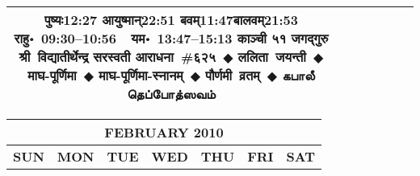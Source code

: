 \documentclass[a3paper,12pt,landscape]{article}
\newcommand{\eventsep}{~$\Diamondblack$ }
\newcommand{\To}{\hspace{1pt}\raisebox{0pt}{\tiny\RIGHTarrow}\hspace{1pt}}
\newcommand{\tamil}[1]{%
{\fontspec[Scale=0.9,FakeStretch=0.9]{Noto Sans Tamil} \footnotesize #1}}
\newcommand{\rahuyama}[2]{%
{राहु॰~\textsf{#1}~~यम॰~\textsf{#2}}
}
\begin{document}
\begin{center}
\begin{tabular}{|c|c|c|c|c|c|c|}
{{\mbox{पुष्यः\To{}\textsf{12:27\hspace{2ex}}}}%
{\mbox{आयुष्मान्\To{}\textsf{22:51\hspace{2ex}}}}%
{\mbox{बवम्\To{}\textsf{11:47\hspace{2ex}}}\mbox{बालवम्\To{}\textsf{21:53\hspace{2ex}}}}}%
{\rahuyama{09:30--10:56}{13:47--15:13}}%
{काञ्ची ५१ जगद्गुरु श्री~विद्यातीर्थेन्द्र सरस्वती आराधना~\#{६२५}\eventsep ललिता~जयन्ती\eventsep माघ-पूर्णिमा\eventsep माघ-पूर्णिमा-स्नानम्\eventsep पौर्णमी~व्रतम्\eventsep \tamil{கபாலீ தெப்போத்ஸவம்}}
\\ \hline %
\end{tabular}



\begin{tabular}{|c|c|c|c|c|c|c|}
\multicolumn{7}{c}{\Large \bfseries \sffamily FEBRUARY 2010}\\[3mm]
\hline
\textbf{\textsf{SUN}} & \textbf{\textsf{MON}} & \textbf{\textsf{TUE}} & \textbf{\textsf{WED}} & \textbf{\textsf{THU}} & \textbf{\textsf{FRI}} & \textbf{\textsf{SAT}} \\ \hline


\end{tabular}
\end{center}
\end{document}
